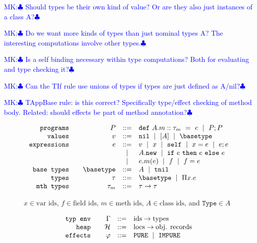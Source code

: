 \documentclass{article}
\def\spmid{\ \mid \ }
\def\MK#1{\textcolor{blue}{\sf MK:$\clubsuit$ #1$\clubsuit$}}
\newcommand{\pure}{\texttt{PURE}}
\newcommand{\impure}{\texttt{IMPURE}}
\newcommand\val{\ensuremath{v}\xspace}
\newcommand\expr{\ensuremath{e}\xspace}
\newcommand\prog{\ensuremath{P}\xspace}
\newcommand\type{\tau}
\newcommand\deptype{\ensuremath{\Pi\var.\expr}}
\newcommand\methtype{\type_m}
\newcommand\pdef[3]{\ensuremath{\texttt{def}\ #1::#2\ =\ #3}\xspace}
\newcommand\var{\ensuremath{x}\xspace}
\newcommand\tnil{\texttt{tnil}\xspace}
\newcommand\vnil{\texttt{nil}\xspace}
\newcommand\vinst[1]{\ensuremath{[#1]}\xspace}
\newcommand\eseq[2]{\ensuremath{#1 ; #2}\xspace}
\newcommand\eassn[2]{\ensuremath{#1 = #2}\xspace}
\newcommand\eif[3]{\ensuremath{\texttt{if}\ #1\ \texttt{then}\ #2\ \texttt{else}\ #3}\xspace}
\newcommand\eself{\texttt{self}\xspace}
\newcommand\emethcall[3]{\ensuremath{#1.#2(#3)}\xspace}
\newcommand\efield{\ensuremath{f}\xspace}
\newcommand\efieldassn[1]{\ensuremath{\efield = #1}\xspace}
\newcommand\enew[1]{\ensuremath{#1 . \texttt{new}}\xspace}
\newcommand\mthtype[2]{\ensuremath{#1 \rightarrow #2}\xspace}
\begin{document}
\MK{Should types be their own kind of value? Or are they also just instances of a class A?}

\MK{Do we want more kinds of types than just nominal types A? The interesting computations involve other types.}

\MK{Is a self binding necessary within type computations? Both for evaluating and type checking it?}

\MK{Can the TIf rule use unions of types if types are just defined as A/nil?}

\MK{TAppBase rule: is this correct? Specifically type/effect checking of method body. Related: should effects be part of method annotation?}
\begin{figure}[t!]
\centering
$$
\begin{array}{rrcl}

\texttt{programs} \quad
& \prog
& ::= & \pdef{A.m}{\methtype}{\expr} \spmid \prog ; \prog
\\

\texttt{values} \quad
& \val
& ::= & \vnil \spmid \vinst{A} \spmid \basetype
\\%

\texttt{expressions} \quad
& \expr
& ::= & \val \spmid \var \spmid \eself \spmid \eassn{\var}{\expr} \spmid \eseq{\expr}{\expr} \\
&     & \spmid & \enew{A} \spmid \eif{\expr}{\expr}{\expr}\\ 
&     & \spmid & \emethcall{e}{m}{e} \spmid \efield \spmid \efieldassn{\expr}
\\

\texttt{base types} \quad
& \basetype
& ::= & A \spmid \tnil\\

\texttt{types} \quad
& \type
& ::= & \basetype \spmid  \deptype \\%

\texttt{mth types} \quad
& \methtype
& ::= & \mthtype{\tau}{\tau}
\end{array}
$$

  $x\in\textrm{var ids}$, $\efield\in\textrm{field ids}$, $m\in\textrm{meth ids}$, $A\in\textrm{class ids}$, and $\texttt{Type}\in A$
  
$$  
\begin{array}{rrcl}
\texttt{typ env} \quad
& \Gamma
& ::= & \textnormal{ids}\rightarrow \textnormal{types}
\\
\texttt{heap} \quad
& \mathcal{H}
& ::= & \textnormal{locs}\rightarrow\textnormal{obj. records}
\\
\texttt{effects}\quad
& \varphi
& ::= & \pure \spmid \impure
\end{array}
$$
\end{figure}
\end{document}
